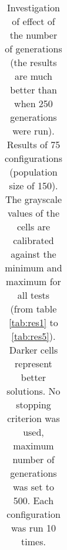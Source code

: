 \begin{table}[h]
\begin{tabular}{ccc|c|c|c|c|c}
\end{tabular}
\caption{Investigation of effect of the number of generations (the results are much better than when 250 generations were run). Results of 75 configurations (population size of 150). The grayscale values of the cells are calibrated against the minimum and maximum for all tests (from table \ref{tab:res1} to \ref{tab:res5}). Darker cells represent better solutions. No stopping criterion was used, maximum number of generations was set to 500. Each configuration was run 10 times.}
\label{tab:res4}
\end{table}


